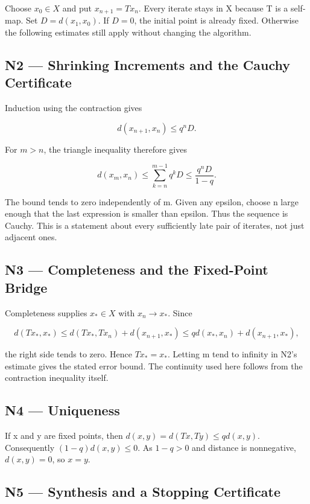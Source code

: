 \documentclass[preprint,12pt,aps,pra,showkeys,amsmath,amssymb,superscriptaddress,floatfix]{revtex4-2}
\theoremstyle{definition}
\theoremstyle{remark}
\begin{document}
Choose \(x_0\in X\) and put \(x_{n+1}=Tx_n\). Every iterate stays in X
because T is a self-map. Set \(D=d(x_1,x_0)\). If \(D=0\), the initial
point is already fixed. Otherwise the following estimates still apply
without changing the algorithm.

\subsection{N2 --- Shrinking Increments and the Cauchy
Certificate}\label{n2-shrinking-increments-and-the-cauchy-certificate}

Induction using the contraction gives

\[d(x_{n+1},x_n)\le q^nD.\]

For \(m>n\), the triangle inequality therefore gives

\[d(x_m,x_n)\le\sum_{k=n}^{m-1}q^kD\le\frac{q^nD}{1-q}.\]

The bound tends to zero independently of m. Given any epsilon, choose n
large enough that the last expression is smaller than epsilon. Thus the
sequence is Cauchy. This is a statement about every sufficiently late
pair of iterates, not just adjacent ones.

\subsection{N3 --- Completeness and the Fixed-Point
Bridge}\label{n3-completeness-and-the-fixed-point-bridge}

Completeness supplies \(x_*\in X\) with \(x_n\to x_*\). Since

\[d(Tx_*,x_*)\le d(Tx_*,Tx_n)+d(x_{n+1},x_*)\le qd(x_*,x_n)+d(x_{n+1},x_*),\]

the right side tends to zero. Hence \(Tx_*=x_*\). Letting m tend to
infinity in N2's estimate gives the stated error bound. The continuity
used here follows from the contraction inequality itself.

\subsection{N4 --- Uniqueness}\label{n4-uniqueness}

If x and y are fixed points, then \(d(x,y)=d(Tx,Ty)\le qd(x,y)\).
Consequently \((1-q)d(x,y)\le0\). As \(1-q>0\) and distance is
nonnegative, \(d(x,y)=0\), so \(x=y\).

\subsection{N5 --- Synthesis and a Stopping
Certificate}\label{n5-synthesis-and-a-stopping-certificate}
\end{document}
